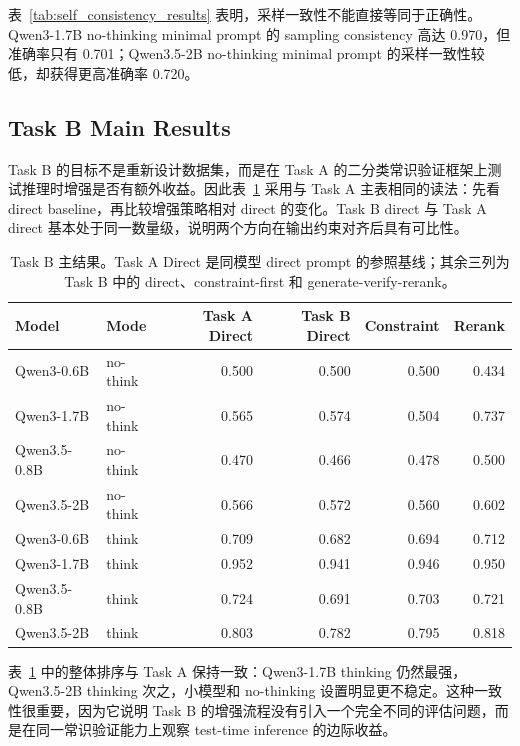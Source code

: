 表~\ref{tab:self_consistency_results} 表明，采样一致性不能直接等同于正确性。Qwen3-1.7B no-thinking minimal prompt 的 sampling consistency 高达 0.970，但准确率只有 0.701；Qwen3.5-2B no-thinking minimal prompt 的采样一致性较低，却获得更高准确率 0.720。

\subsection{Task B Main Results}

Task B 的目标不是重新设计数据集，而是在 Task A 的二分类常识验证框架上测试推理时增强是否有额外收益。因此表~\ref{tab:verification_results} 采用与 Task A 主表相同的读法：先看 direct baseline，再比较增强策略相对 direct 的变化。Task B direct 与 Task A direct 基本处于同一数量级，说明两个方向在输出约束对齐后具有可比性。

\begin{table}[t]
\centering
\small
\setlength{\tabcolsep}{4.5pt}
\begin{tabular}{llrrrr}
\toprule
Model & Mode & Task A Direct & Task B Direct & Constraint & Rerank \\
\midrule
Qwen3-0.6B & no-think & 0.500 & 0.500 & 0.500 & 0.434 \\
Qwen3-1.7B & no-think & 0.565 & 0.574 & 0.504 & 0.737 \\
Qwen3.5-0.8B & no-think & 0.470 & 0.466 & 0.478 & 0.500 \\
Qwen3.5-2B & no-think & 0.566 & 0.572 & 0.560 & 0.602 \\
Qwen3-0.6B & think & 0.709 & 0.682 & 0.694 & 0.712 \\
Qwen3-1.7B & think & 0.952 & 0.941 & 0.946 & 0.950 \\
Qwen3.5-0.8B & think & 0.724 & 0.691 & 0.703 & 0.721 \\
Qwen3.5-2B & think & 0.803 & 0.782 & 0.795 & 0.818 \\
\bottomrule
\end{tabular}
\caption{Task B 主结果。Task A Direct 是同模型 direct prompt 的参照基线；其余三列为 Task B 中的 direct、constraint-first 和 generate-verify-rerank。}
\label{tab:verification_results}
\end{table}

表~\ref{tab:verification_results} 中的整体排序与 Task A 保持一致：Qwen3-1.7B thinking 仍然最强，Qwen3.5-2B thinking 次之，小模型和 no-thinking 设置明显更不稳定。这种一致性很重要，因为它说明 Task B 的增强流程没有引入一个完全不同的评估问题，而是在同一常识验证能力上观察 test-time inference 的边际收益。

